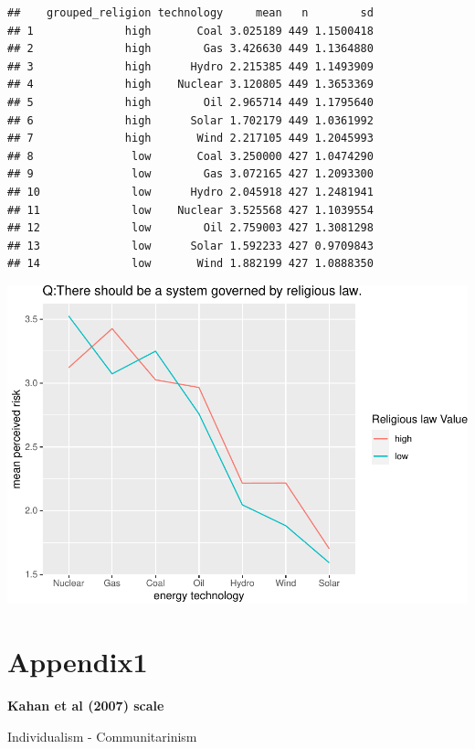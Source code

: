 \documentclass[
]{article}
\begin{document}
\begin{verbatim}
##    grouped_religion technology     mean   n        sd
## 1              high       Coal 3.025189 449 1.1500418
## 2              high        Gas 3.426630 449 1.1364880
## 3              high      Hydro 2.215385 449 1.1493909
## 4              high    Nuclear 3.120805 449 1.3653369
## 5              high        Oil 2.965714 449 1.1795640
## 6              high      Solar 1.702179 449 1.0361992
## 7              high       Wind 2.217105 449 1.2045993
## 8               low       Coal 3.250000 427 1.0474290
## 9               low        Gas 3.072165 427 1.2093300
## 10              low      Hydro 2.045918 427 1.2481941
## 11              low    Nuclear 3.525568 427 1.1039554
## 12              low        Oil 2.759003 427 1.3081298
## 13              low      Solar 1.592233 427 0.9709843
## 14              low       Wind 1.882199 427 1.0888350
\end{verbatim}

\includegraphics{Significant_results_files/figure-latex/unnamed-chunk-22-1.pdf}

\newpage

\hypertarget{appendix1}{%
\section{Appendix1}\label{appendix1}}

\textbf{Kahan et al (2007) scale}

Individualism - Communitarinism
\end{document}
